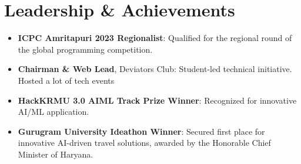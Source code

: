 \documentclass[letterpaper,11pt]{article}
\begin{document}
\section{Leadership \& Achievements}
\begin{itemize}[leftmargin=*,itemsep=2pt,parsep=0pt,topsep=0pt,partopsep=0pt]
    \item \textbf{ICPC Amritapuri 2023 Regionalist}: Qualified for the regional round of the global programming competition.
    \item \textbf{Chairman \& Web Lead}, Deviators Club: Student-led technical initiative. Hosted a lot of tech events
    \item \textbf{HackKRMU 3.0 AIML Track Prize Winner}: Recognized for innovative AI/ML application.
    \item \textbf{Gurugram University Ideathon Winner}: Secured first place for innovative AI-driven travel solutions, awarded by the Honorable Chief Minister of Haryana.
\end{itemize}
\end{document}
